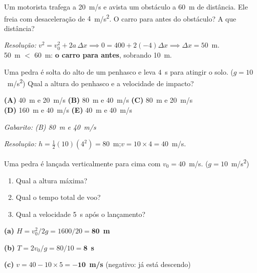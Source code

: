 \documentclass[12pt,a4paper]{article}
\begin{document}
\begin{tcolorbox}[enembox={Quest\~ao 4 --- MRUV: dist\^ancia de frenagem}]
  Um motorista trafega a 20~m/s e avista um obst\'aculo a 60~m de dist\^ancia.
  Ele freia com desacelera\c{c}\~ao de $4$~m/s\textsuperscript{2}.
  O carro para antes do obst\'aculo? A que dist\^ancia?

  \medskip
  \textit{Resolu\c{c}\~ao:}
  $v^2 = v_0^2 + 2a\,\Delta x \implies 0 = 400 + 2(-4)\Delta x
  \implies \Delta x = 50$~m.\\
  50~m $<$ 60~m: \textbf{o carro para antes}, sobrando 10~m.
\end{tcolorbox}

\begin{tcolorbox}[enembox={Quest\~ao 5 --- Queda livre}]
  Uma pedra \'e solta do alto de um penhasco e leva $4$~s para atingir o solo.
  ($g = 10$~m/s\textsuperscript{2})
  Qual a altura do penhasco e a velocidade de impacto?

  \medskip
  \textbf{(A)} 40~m e 20~m/s \quad
  \textbf{(B)} 80~m e 40~m/s \quad
  \textbf{(C)} 80~m e 20~m/s \\
  \textbf{(D)} 160~m e 40~m/s \quad
  \textbf{(E)} 40~m e 40~m/s

  \medskip
  \textit{Gabarito: (B) 80~m e 40~m/s}

  \textit{Resolu\c{c}\~ao:}
  $h = \tfrac{1}{2}(10)(4^2) = 80$~m;\quad $v = 10 \times 4 = 40$~m/s.
\end{tcolorbox}

\begin{tcolorbox}[enembox={Quest\~ao 6 --- Lan\c{c}amento vertical para cima}]
  Uma pedra \'e lan\c{c}ada verticalmente para cima com $v_0 = 40$~m/s.
  ($g = 10$~m/s\textsuperscript{2})
  \begin{enumerate}[label=(\alph*), nosep]
    \item Qual a altura m\'axima?
    \item Qual o tempo total de voo?
    \item Qual a velocidade 5~s ap\'os o lan\c{c}amento?
  \end{enumerate}

  \medskip
  \textbf{(a)} $H = v_0^2/2g = 1600/20 = \mathbf{80}$~\textbf{m}

  \textbf{(b)} $T = 2v_0/g = 80/10 = \mathbf{8}$~\textbf{s}

  \textbf{(c)} $v = 40 - 10\times5 = \mathbf{-10}$~\textbf{m/s}
  (negativo: j\'a est\'a descendo)
\end{tcolorbox}
\end{document}
